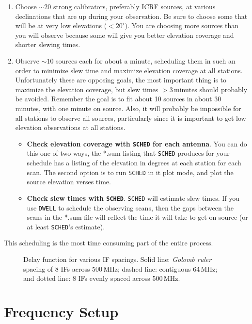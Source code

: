 \documentclass[preprint]{aastex}
\begin{document}
\begin{enumerate}
\item Choose $\sim 20$ strong calibrators, preferably ICRF sources, at various
declinations that are up during your
observation.  Be sure to choose some that will be at very low elevations
($< 20^\circ $).  You
are choosing more sources than you will observe because some will give you better
elevation coverage and shorter slewing times.
\item Observe $\sim 10$ sources each for about a minute, scheduling
them in such an order to minimize slew time and maximize elevation coverage
at all stations.  Unfortunately these are opposing goals, the most
important thing is to maximize the elevation coverage, but slew times $> 3$\,minutes
should probably be avoided.  Remember the goal is to fit about 10 sources in about
30 minutes, with one minute on source.  Also, it will probably be impossible
for all stations to observe all sources, particularly since it is important
to get low elevation observations at all stations.
\begin{itemize}
\item {\bf Check elevation coverage with {\tt SCHED} for each antenna}.
You can do this one of two ways,
the *.sum listing that {\tt SCHED} produces for your schedule has a listing of
the elevation in degrees at each station for each scan.  The second option
is to run {\tt SCHED} in it plot mode, and plot the source elevation verses time.
\item {\bf Check slew times with {\tt SCHED}}.  {\tt SCHED} will estimate slew times.
If you use {\tt DWELL} to schedule the observing scans, then the gaps between the
scans in the *.sum file will reflect the time it will take to get on source (or
at least {\tt SCHED}'s estimate).
\end{itemize}
\end{enumerate}

This scheduling is the most time consuming part of the entire process.

\begin{figure}[t!]
\caption{Delay function for various IF spacings.  Solid line: {\it Golomb ruler}
spacing of 8 IFs across 500\,MHz; dashed line: contiguous 64\,MHz; and dotted
line: 8 IFs evenly spaced across 500\,MHz.
}
\label{dlyfn}
\end{figure}

\section{Frequency Setup}
\end{document}

